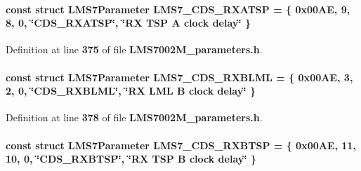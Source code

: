 \paragraph[{L\+M\+S7\+\_\+\+C\+D\+S\+\_\+\+R\+X\+A\+T\+SP}]{\setlength{\rightskip}{0pt plus 5cm}const struct {\bf L\+M\+S7\+Parameter} L\+M\+S7\+\_\+\+C\+D\+S\+\_\+\+R\+X\+A\+T\+SP = \{ 0x00\+A\+E, 9, 8, 0, \char`\"{}\+C\+D\+S\+\_\+\+R\+X\+A\+T\+S\+P\char`\"{}, \char`\"{}\+R\+X T\+S\+P A clock delay\char`\"{} \}\hspace{0.3cm}{\ttfamily [static]}}\label{LMS7002M__parameters_8h_a4864553cd452302779b0156ff32b1e17}


Definition at line {\bf 375} of file {\bf L\+M\+S7002\+M\+\_\+parameters.\+h}.

\paragraph[{L\+M\+S7\+\_\+\+C\+D\+S\+\_\+\+R\+X\+B\+L\+ML}]{\setlength{\rightskip}{0pt plus 5cm}const struct {\bf L\+M\+S7\+Parameter} L\+M\+S7\+\_\+\+C\+D\+S\+\_\+\+R\+X\+B\+L\+ML = \{ 0x00\+A\+E, 3, 2, 0, \char`\"{}\+C\+D\+S\+\_\+\+R\+X\+B\+L\+M\+L\char`\"{}, \char`\"{}\+R\+X L\+M\+L B clock delay\char`\"{} \}\hspace{0.3cm}{\ttfamily [static]}}\label{LMS7002M__parameters_8h_a80123e8b085674fad3e6ee9a83afee93}


Definition at line {\bf 378} of file {\bf L\+M\+S7002\+M\+\_\+parameters.\+h}.

\paragraph[{L\+M\+S7\+\_\+\+C\+D\+S\+\_\+\+R\+X\+B\+T\+SP}]{\setlength{\rightskip}{0pt plus 5cm}const struct {\bf L\+M\+S7\+Parameter} L\+M\+S7\+\_\+\+C\+D\+S\+\_\+\+R\+X\+B\+T\+SP = \{ 0x00\+A\+E, 11, 10, 0, \char`\"{}\+C\+D\+S\+\_\+\+R\+X\+B\+T\+S\+P\char`\"{}, \char`\"{}\+R\+X T\+S\+P B clock delay\char`\"{} \}\hspace{0.3cm}{\ttfamily [static]}}\label{LMS7002M__parameters_8h_a4c10c074fd6a88f52b825be51917b4d6}


